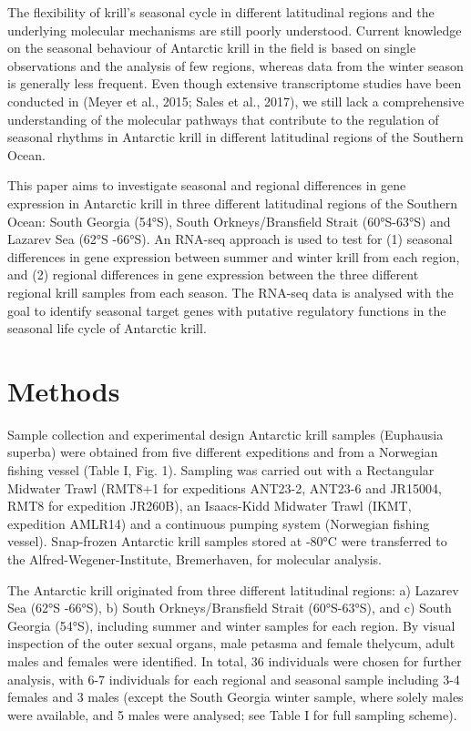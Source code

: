 The flexibility of krill's seasonal cycle in different latitudinal regions and the underlying molecular mechanisms are still poorly understood. Current knowledge on the seasonal behaviour of Antarctic krill in the field is based on single observations and the analysis of few regions, whereas data from the winter season is generally less frequent. Even though extensive transcriptome studies have been conducted in  (Meyer et al., 2015; Sales et al., 2017), we still lack a comprehensive understanding of the molecular pathways that contribute to the regulation of seasonal rhythms in Antarctic krill in different latitudinal regions of the Southern Ocean. 

This paper aims to investigate seasonal and regional differences in gene expression in Antarctic krill in three different latitudinal regions of the Southern Ocean: South Georgia (54°S), South Orkneys/Bransfield Strait (60°S-63°S) and Lazarev Sea (62°S -66°S). An RNA-seq approach is used to test for (1) seasonal differences in gene expression between summer and winter krill from each region, and (2) regional differences in gene expression between the three different regional krill samples from each season. The RNA-seq data is analysed with the goal to identify seasonal target genes with putative regulatory functions in the seasonal life cycle of Antarctic krill.

\section{Methods}

Sample collection and experimental design
Antarctic krill samples (Euphausia superba) were obtained from five different expeditions and from a Norwegian fishing vessel (Table I, Fig. 1).  Sampling was carried out with a Rectangular Midwater Trawl (RMT8+1 for expeditions ANT23-2, ANT23-6 and JR15004, RMT8 for expedition JR260B), an Isaacs-Kidd Midwater Trawl (IKMT, expedition AMLR14) and a continuous pumping system (Norwegian fishing vessel).  Snap-frozen Antarctic krill samples stored at -80°C were transferred to the Alfred-Wegener-Institute, Bremerhaven, for molecular analysis.

The Antarctic krill originated from three different latitudinal regions: a) Lazarev Sea (62°S -66°S), b) South Orkneys/Bransfield Strait (60°S-63°S), and c) South Georgia (54°S), including summer and winter samples for each region. By visual inspection of the outer sexual organs, male petasma and female thelycum, adult males and females were identified. In total, 36 individuals were chosen for further analysis, with 6-7 individuals for each regional and seasonal sample including 3-4 females and 3 males (except the South Georgia winter sample, where solely males were available, and 5 males were analysed; see Table I for full sampling scheme).


